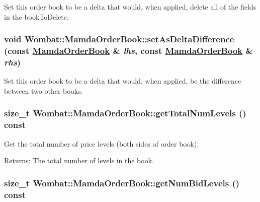 Set this order book to be a delta that would, when applied, delete all of the fields in the book\-To\-Delete. 

\hypertarget{classWombat_1_1MamdaOrderBook_73888fb2449dab613730a7cb81ea772d}{
\subsubsection[setAsDeltaDifference]{\setlength{\rightskip}{0pt plus 5cm}void Wombat::Mamda\-Order\-Book::set\-As\-Delta\-Difference (const \hyperlink{classWombat_1_1MamdaOrderBook}{Mamda\-Order\-Book} \& {\em lhs}, const \hyperlink{classWombat_1_1MamdaOrderBook}{Mamda\-Order\-Book} \& {\em rhs})}}
\label{classWombat_1_1MamdaOrderBook_73888fb2449dab613730a7cb81ea772d}


Set this order book to be a delta that would, when applied, be the difference between two other books. 

\hypertarget{classWombat_1_1MamdaOrderBook_4adce908276fbd03b2d670ef7774fb70}{
\subsubsection[getTotalNumLevels]{\setlength{\rightskip}{0pt plus 5cm}size\_\-t Wombat::Mamda\-Order\-Book::get\-Total\-Num\-Levels () const}}
\label{classWombat_1_1MamdaOrderBook_4adce908276fbd03b2d670ef7774fb70}


Get the total number of price levels (both sides of order book). 

\begin{Desc}
\item[Returns:]The total number of levels in the book. \end{Desc}
\hypertarget{classWombat_1_1MamdaOrderBook_7dccd978f9d8e7e873a96862d48d2946}{
\subsubsection[getNumBidLevels]{\setlength{\rightskip}{0pt plus 5cm}size\_\-t Wombat::Mamda\-Order\-Book::get\-Num\-Bid\-Levels () const}}
\label{classWombat_1_1MamdaOrderBook_7dccd978f9d8e7e873a96862d48d2946}


